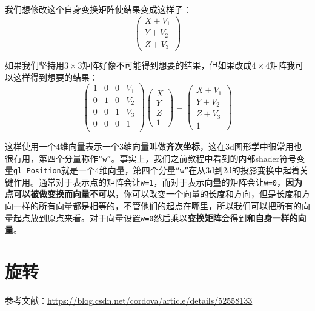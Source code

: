 \documentclass[UTF8,a4paper,12pt]{ctexbook}
\begin{document}
		我们想修改这个自身变换矩阵使结果变成这样子：
			$$
				\left(
				\begin{array}{c}
				X+V_1\\ 
				Y+V_2\\
				Z+V_3 
				\end{array}	
				\right)
			$$
		
		如果我们坚持用$3\times3$矩阵好像不可能得到想要的结果，但如果改成$4\times4$矩阵我可以这样得到想要的结果：
			\begin{equation}
			\left(
			\begin{array}{cccc}
			1 & 0 & 0& V_1\\
			
			0 & 1 & 0& V_2\\
			
			0 & 0 & 1& V_3\\
			
			0 & 0 & 0& 1\\
			\end{array}
			\right)
			\left(
			\begin{array}{c}
			X\\ 
			Y\\
			Z\\
			1 
			\end{array}	
			\right) 
			=
			\left(
			\begin{array}{c}
			X+V_1\\ 
			Y+V_2\\
			Z+V_3\\
			1 
			\end{array}	
			\right)
			\end{equation}
		
		这样使用一个4维向量表示一个3维向量叫做\textbf{齐次坐标}，这在3d图形学中很常用也很有用，第四个分量称作\verb|“w”|。事实上，我们之前教程中看到的内部shader符号变量\verb|gl_Position|就是一个4维向量，第四个分量\verb|“w”|在从3d到2d的投影变换中起着关键作用。通常对于表示点的矩阵会让\verb|w=1|，而对于表示向量的矩阵会让\verb|w=0|，\textbf{因为点可以被做变换而向量不可以}，你可以改变一个向量的长度和方向，但是长度和方向一样的所有向量都是相等的，不管他们的起点在哪里，所以我们可以把所有的向量起点放到原点来看。对于向量设置\verb|w=0|然后乘以\textbf{变换矩阵}会得到\textbf{和自身一样的向量}。
		
	\section{旋转}
		参考文献：\url{https://blog.csdn.net/cordova/article/details/52558133}
		
\end{document}
